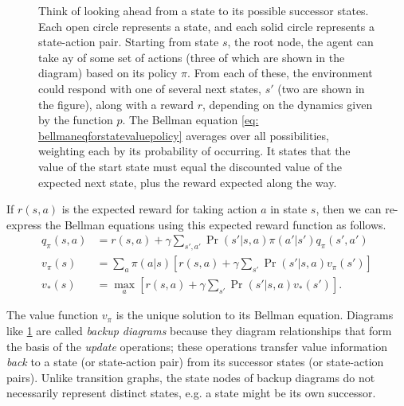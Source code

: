 \documentclass[12pt]{article}
\begin{document}
\begin{figure}[h]
  \centering
\caption{\footnotesize Think of looking ahead from a state to its possible successor states. Each open circle represents a state, and each solid circle represents a state-action pair. Starting from state $s$, the root node, the agent can take ay of some set of actions (three of which are shown in the diagram) based on its policy $\pi$. From each of these, the environment could respond with one of several next states, $s'$ (two are shown in the figure), along with a reward $r$, depending on the dynamics given by the function $p$. The Bellman equation \ref{eq: bellmaneqforstatevaluepolicy} averages over all possibilities, weighting each by its probability of occurring. It states that the value of the start state must equal the discounted value of the expected next state, plus the reward expected along the way.}
\label{fig: bellmanlookahead}
\end{figure}

If $r(s,a)$ is the expected reward for taking action $a$ in state $s$, then we can re-express the Bellman equations using this expected reward function as follows.
\begin{align*}
  q_\pi(s,a) &= r(s,a) + \gamma \sum_{s', a'} \Pr(s' | s, a) \pi(a'|s')                q_\pi(s',a') \\
  v_\pi(s) &= \sum_a \pi(a|s) \left[r(s,a) + \gamma \sum_{s'} \Pr(s'|s,a)              v_\pi(s')\right] \\
  v_*(s) &= \max_a \left[r(s,a) + \gamma \sum_{s'} \Pr(s'|s,a) v_*(s')\right].
\end{align*}

The value function $v_\pi$ is the unique solution to its Bellman equation. Diagrams like \ref{fig: bellmanlookahead} are called \emph{backup diagrams} because they diagram relationships that form the basis of the \emph{update} operations; these operations transfer value information \emph{back} to a state (or state-action pair) from its successor states (or state-action pairs). Unlike transition graphs, the state nodes of backup diagrams do not necessarily represent distinct states, e.g. a state might be its own successor.
\end{document}
